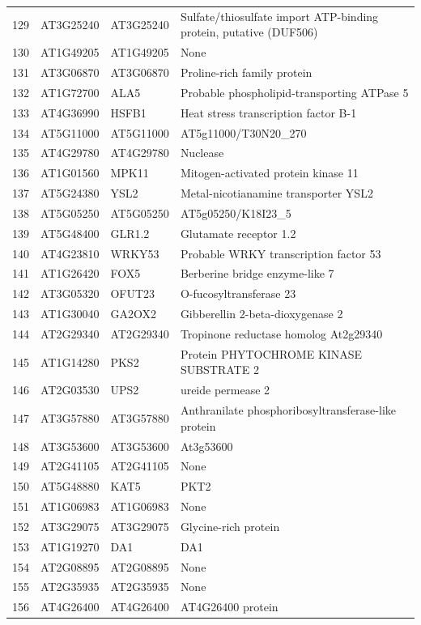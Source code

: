 \documentclass[11pt]{article}
\begin{document}
\begin{center}
\begin{tabular}{rlll}
129 & AT3G25240 & AT3G25240 & Sulfate/thiosulfate import ATP-binding protein, putative (DUF506)\\
130 & AT1G49205 & AT1G49205 & None\\
131 & AT3G06870 & AT3G06870 & Proline-rich family protein\\
132 & AT1G72700 & ALA5 & Probable phospholipid-transporting ATPase 5\\
133 & AT4G36990 & HSFB1 & Heat stress transcription factor B-1\\
134 & AT5G11000 & AT5G11000 & AT5g11000/T30N20\_270\\
135 & AT4G29780 & AT4G29780 & Nuclease\\
136 & AT1G01560 & MPK11 & Mitogen-activated protein kinase 11\\
137 & AT5G24380 & YSL2 & Metal-nicotianamine transporter YSL2\\
138 & AT5G05250 & AT5G05250 & AT5g05250/K18I23\_5\\
139 & AT5G48400 & GLR1.2 & Glutamate receptor 1.2\\
140 & AT4G23810 & WRKY53 & Probable WRKY transcription factor 53\\
141 & AT1G26420 & FOX5 & Berberine bridge enzyme-like 7\\
142 & AT3G05320 & OFUT23 & O-fucosyltransferase 23\\
143 & AT1G30040 & GA2OX2 & Gibberellin 2-beta-dioxygenase 2\\
144 & AT2G29340 & AT2G29340 & Tropinone reductase homolog At2g29340\\
145 & AT1G14280 & PKS2 & Protein PHYTOCHROME KINASE SUBSTRATE 2\\
146 & AT2G03530 & UPS2 & ureide permease 2\\
147 & AT3G57880 & AT3G57880 & Anthranilate phosphoribosyltransferase-like protein\\
148 & AT3G53600 & AT3G53600 & At3g53600\\
149 & AT2G41105 & AT2G41105 & None\\
150 & AT5G48880 & KAT5 & PKT2\\
151 & AT1G06983 & AT1G06983 & None\\
152 & AT3G29075 & AT3G29075 & Glycine-rich protein\\
153 & AT1G19270 & DA1 & DA1\\
154 & AT2G08895 & AT2G08895 & None\\
155 & AT2G35935 & AT2G35935 & None\\
156 & AT4G26400 & AT4G26400 & AT4G26400 protein\\

\end{tabular}
\end{center}
\end{document}
